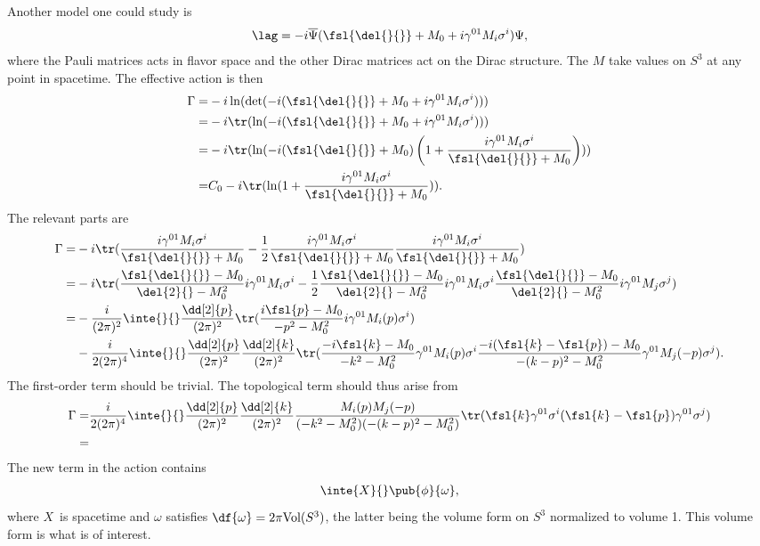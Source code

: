 Another model one could study is
\begin{align*}
	\lag = -i\overline{\Psi}(\fsl{\del{}{}} + M_{0} + i\gamma^{01}M_{i}\sigma^{i})\Psi,
\end{align*}
where the Pauli matrices acts in flavor space and the other Dirac matrices act on the Dirac structure. The $M$ take values on $S^{3}$ at any point in spacetime. The effective action is then
\begin{align*}
	\Gamma =& -i\ln(\det(-i(\fsl{\del{}{}} + M_{0} + i\gamma^{01}M_{i}\sigma^{i}))) \\
	       =& -i\tr(\ln(-i(\fsl{\del{}{}} + M_{0} + i\gamma^{01}M_{i}\sigma^{i}))) \\
	       =& -i\tr(\ln(-i(\fsl{\del{}{}} + M_{0})\left(1 + \frac{i\gamma^{01}M_{i}\sigma^{i}}{\fsl{\del{}{}} + M_{0}}\right))) \\
	       =& C_{0} - i\tr(\ln(1 + \frac{i\gamma^{01}M_{i}\sigma^{i}}{\fsl{\del{}{}} + M_{0}})).
\end{align*}
The relevant parts are
\begin{align*}
	\Gamma =& -i\tr(\frac{i\gamma^{01}M_{i}\sigma^{i}}{\fsl{\del{}{}} + M_{0}} - \frac{1}{2}\frac{i\gamma^{01}M_{i}\sigma^{i}}{\fsl{\del{}{}} + M_{0}}\frac{i\gamma^{01}M_{i}\sigma^{i}}{\fsl{\del{}{}} + M_{0}}) \\
	       =& -i\tr(\frac{\fsl{\del{}{}} - M_{0}}{\del{2}{} - M_{0}^{2}}i\gamma^{01}M_{i}\sigma^{i} - \frac{1}{2}\frac{\fsl{\del{}{}} - M_{0}}{\del{2}{} - M_{0}^{2}}i\gamma^{01}M_{i}\sigma^{i}\frac{\fsl{\del{}{}} - M_{0}}{\del{2}{} - M_{0}^{2}}i\gamma^{01}M_{j}\sigma^{j}) \\
	       =& -\frac{i}{(2\pi)^{2}}\inte{}{}\frac{\dd[2]{p}}{(2\pi)^{2}}\tr(\frac{i\fsl{p} - M_{0}}{-p^{2} - M_{0}^{2}}i\gamma^{01}M_{i}(p)\sigma^{i}) \\
	        &- \frac{i}{2(2\pi)^{4}}\inte{}{}\frac{\dd[2]{p}}{(2\pi)^{2}}\frac{\dd[2]{k}}{(2\pi)^{2}}\tr(\frac{-i\fsl{k} - M_{0}}{-k^{2} - M_{0}^{2}}\gamma^{01}M_{i}(p)\sigma^{i}\frac{-i(\fsl{k} - \fsl{p}) - M_{0}}{-(k - p)^{2} - M_{0}^{2}}\gamma^{01}M_{j}(-p)\sigma^{j}).
\end{align*}
The first-order term should be trivial. The topological term should thus arise from
\begin{align*}
	\Gamma =& \frac{i}{2(2\pi)^{4}}\inte{}{}\frac{\dd[2]{p}}{(2\pi)^{2}}\frac{\dd[2]{k}}{(2\pi)^{2}}\frac{M_{i}(p)M_{j}(-p)}{(-k^{2} - M_{0}^{2})(-(k - p)^{2} - M_{0}^{2})}\tr(\fsl{k}\gamma^{01}\sigma^{i}(\fsl{k} - \fsl{p})\gamma^{01}\sigma^{j}) \\
	       =&
\end{align*}
The new term in the action contains
\begin{align*}
	\inte{X}{}\pub{\phi}{\omega},
\end{align*}
where $X$ is spacetime and $\omega$ satisfies $\df{\omega} = 2\pi\text{Vol}(S^{3})$, the latter being the volume form on $S^{3}$ normalized to volume 1. This volume form is what is of interest.

